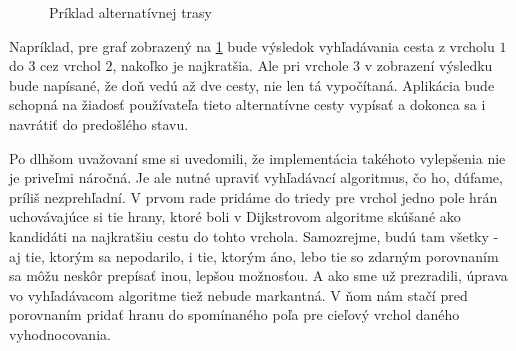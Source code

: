\begin{figure}[H]
  \caption{Príklad alternatívnej trasy}
  \label{alternativ_priklad}
\end{figure}

 Napríklad, pre graf zobrazený na \ref{alternativ_priklad} bude výsledok vyhľadávania cesta z vrcholu $1$ do $3$ cez vrchol $2$, nakoľko je najkratšia. Ale pri vrchole $3$ v zobrazení výsledku bude napísané, že doň vedú až dve cesty, nie len tá vypočítaná. Aplikácia bude schopná na žiadosť používateľa tieto alternatívne cesty vypísať a dokonca sa i navrátiť do predošlého stavu.\newline

Po dlhšom uvažovaní sme si uvedomili, že implementácia takéhoto vylepšenia nie je priveľmi náročná. Je ale nutné upraviť vyhľadávací algoritmus, čo ho, dúfame, príliš nezprehľadní. V prvom rade pridáme do triedy pre vrchol jedno pole hrán uchovávajúce si tie hrany, ktoré boli v Dijkstrovom algoritme skúšané ako kandidáti na najkratšiu cestu do tohto vrchola. Samozrejme, budú tam všetky - aj tie, ktorým sa nepodarilo, i tie, ktorým áno, lebo tie so zdarným porovnaním sa môžu neskôr prepísať inou, lepšou možnosťou. A ako sme už prezradili, úprava vo vyhľadávacom algoritme tiež nebude markantná. V ňom nám stačí pred porovnaním pridať hranu do spomínaného poľa pre cieľový vrchol daného vyhodnocovania.\newline

